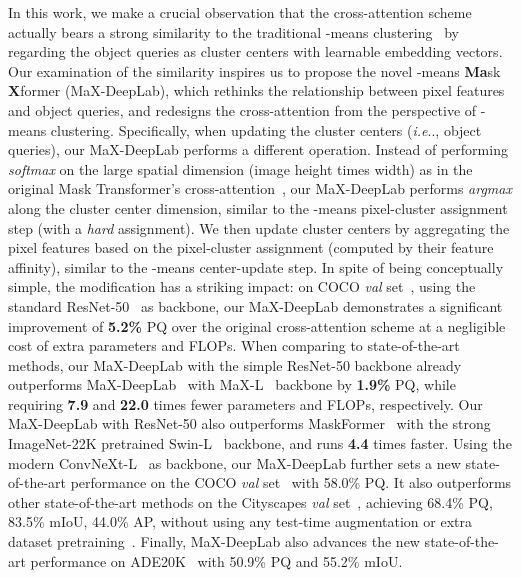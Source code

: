 \documentclass[runningheads]{llncs}
\makeatletter
\DeclareRobustCommand\onedot{\futurelet\@let@token\@onedot}
\def\@onedot{\ifx\@let@token.\else.\null\fi\xspace}
\def\ie{\emph{i.e}\onedot} \def\Ie{\emph{I.e}\onedot}
\makeatother
\begin{document}
In this work, we make a crucial observation that the cross-attention scheme actually bears a strong similarity to the traditional -means clustering~\cite{lloyd1982least} by regarding the object queries as cluster centers with learnable embedding vectors.
Our examination of the similarity inspires us to propose the novel -means \textbf{Ma}sk \textbf{X}former (MaX-DeepLab), which rethinks the relationship between pixel features and object queries, and redesigns the cross-attention from the perspective of -means clustering.
Specifically, when updating the cluster centers (\ie, object queries), our MaX-DeepLab performs a different operation.
Instead of performing \textit{softmax} on the large spatial dimension (image height times  width) as in the original Mask Transformer's cross-attention~\cite{wang2021max}, our MaX-DeepLab performs \textit{argmax} along the cluster center dimension, similar to the -means pixel-cluster assignment step (with a \textit{hard} assignment). 
We then update cluster centers by aggregating the pixel features based on the pixel-cluster assignment (computed by their feature affinity), similar to the -means center-update step.
In spite of being conceptually simple, the modification has a striking impact: on COCO \textit{val} set~\cite{lin2014microsoft}, using the standard ResNet-50~\cite{he2016deep} as backbone, our MaX-DeepLab demonstrates a significant improvement of \textbf{5.2\%} PQ over the original cross-attention scheme at a negligible cost of extra parameters and FLOPs.
When comparing to state-of-the-art methods, our MaX-DeepLab with the simple ResNet-50 backbone already outperforms MaX-DeepLab~\cite{wang2021max} with MaX-L~\cite{wang2021max} backbone by \textbf{1.9\%} PQ, while requiring \textbf{7.9} and \textbf{22.0} times fewer parameters and FLOPs, respectively. Our MaX-DeepLab with ResNet-50 also outperforms MaskFormer~\cite{cheng2021per} with the strong ImageNet-22K pretrained Swin-L~\cite{liu2021swin} backbone, and runs \textbf{4.4} times faster.
Using the modern ConvNeXt-L~\cite{liu2022convnet} as backbone, our MaX-DeepLab further sets a new state-of-the-art performance on the COCO \textit{val} set~\cite{lin2014microsoft} with 58.0\% PQ. It also outperforms other state-of-the-art methods on the Cityscapes \textit{val} set~\cite{Cordts2016Cityscapes}, achieving 68.4\% PQ, 83.5\% mIoU, 44.0\% AP, without using any test-time augmentation or extra dataset pretraining~\cite{lin2014microsoft,neuhold2017mapillary}.
Finally, MaX-DeepLab also advances the new state-of-the-art performance on ADE20K~\cite{zhou2017scene} with 50.9\% PQ and 55.2\% mIoU.
\end{document}
